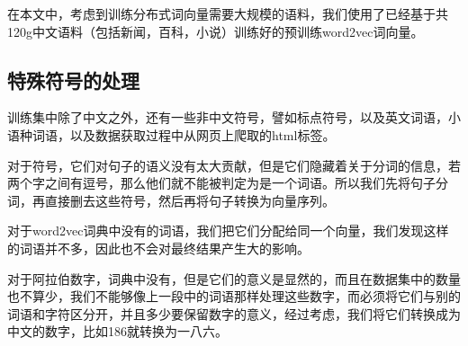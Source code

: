 \documentclass[UTF8]{ctexart}
\begin{document}
在本文中，考虑到训练分布式词向量需要大规模的语料，我们使用了已经基于共120g中文语料（包括新闻，百科，小说）训练好的预训练word2vec词向量。
\subsection{特殊符号的处理}
训练集中除了中文之外，还有一些非中文符号，譬如标点符号，以及英文词语，小语种词语，以及数据获取过程中从网页上爬取的html标签。

对于符号，它们对句子的语义没有太大贡献，但是它们隐藏着关于分词的信息，若两个字之间有逗号，那么他们就不能被判定为是一个词语。所以我们先将句子分词，再直接删去这些符号，然后再将句子转换为向量序列。

对于word2vec词典中没有的词语，我们把它们分配给同一个向量，我们发现这样的词语并不多，因此也不会对最终结果产生大的影响。

对于阿拉伯数字，词典中没有，但是它们的意义是显然的，而且在数据集中的数量也不算少，我们不能够像上一段中的词语那样处理这些数字，而必须将它们与别的词语和字符区分开，并且多少要保留数字的意义，经过考虑，我们将它们转换成为中文的数字，比如186就转换为一八六。
\end{document}
